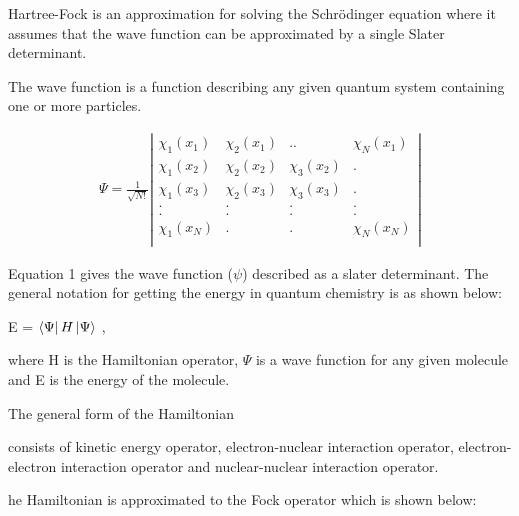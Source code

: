 \documentclass[twoside]{article}
\begin{document}
 Hartree-Fock is an approximation for solving the Schrödinger equation 
where it assumes that the wave function can be approximated by a single Slater determinant.  

The wave function is a function describing any given quantum system containing one or more particles. 


\begin{eqnarray}
\Psi=
\frac{1}{\sqrt{N!}}\left|
\begin{array}{cccc}
\chi_1(x_1)&\chi_2(x_1)&..&\chi_N(x_1)\\
\chi_1(x_2)&\chi_2(x_2)&\chi_3(x_2)&.\\
\chi_1(x_3)&\chi_2(x_3)&\chi_3(x_3)&.\\
.&.&.&.\\
.&.&.&.\\
\chi_1(x_N)&.&.&\chi_N(x_N)\\
\end{array}
\right|
\end{eqnarray}


Equation 1 gives the wave function ($\psi$) described as a slater determinant. The general notation for getting the energy in quantum chemistry is as shown below:


E = $\Bra{\Psi}H\Ket{\Psi}$ ,

where H is the Hamiltonian operator, $\Psi$ is a wave function for any given molecule and E is the energy of the molecule. 

The general form of the Hamiltonian 

consists of kinetic energy operator, electron-nuclear interaction operator, electron-electron interaction operator and nuclear-nuclear interaction operator.

 he Hamiltonian is approximated to the Fock operator which is shown below:
\end{document}
